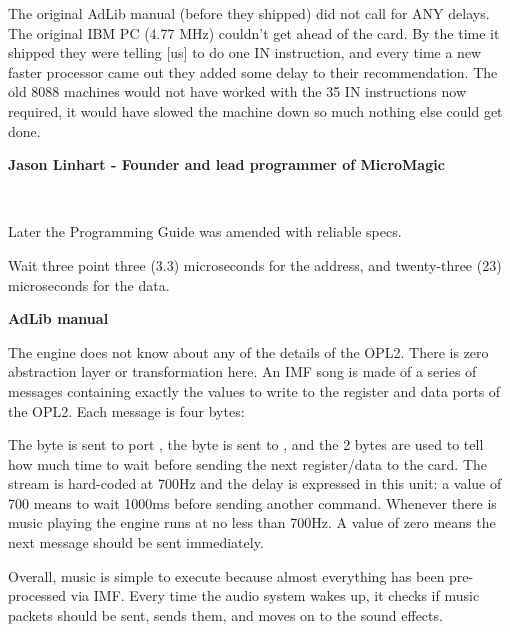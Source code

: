 \begin{fancyquotes}
The original AdLib manual (before they shipped) did not call for ANY delays. The original IBM PC (4.77 MHz) couldn't get ahead of the card. By the time it shipped they were telling [us] to do one IN instruction, and every time a new faster processor came out they added some delay to their recommendation. The old 8088 machines would not have worked with the 35 IN instructions now required, it would have slowed the machine down so much nothing else could get done\footnotemark.\\
 \par
 \textbf{Jason Linhart - Founder and lead programmer of MicroMagic}
 \end{fancyquotes}
\\
\par
Later the Programming Guide was amended with reliable specs.\\
\par
\begin{fancyquotes}
Wait three point three (3.3) microseconds for the address, and twenty-three (23) microseconds for the data.\\
\par
\textbf{AdLib manual}
 \end{fancyquotes}
 

\par
The engine does not know about any of the details of the OPL2. There is zero abstraction layer or transformation here. An IMF song is made of a series of messages containing exactly the values to write to the register and data ports of the OPL2. Each message is four bytes:\\
\par
\begin{minipage}{\textwidth}

\end{minipage}
\par
The  byte is sent to port , the  byte is sent to , and the  2 bytes are used to tell how much time to wait before sending the next register/data to the card. The stream is hard-coded at 700Hz and the delay is expressed in this unit: a value of 700 means to wait 1000ms before sending another command. Whenever there is music playing the engine runs at no less than 700Hz. A value of zero means the next message should be sent immediately.\\
\par
Overall, music is simple to execute because almost everything has been pre-processed via IMF. Every time the audio system wakes up, it checks if music packets should be sent, sends them, and moves on to the sound effects.










